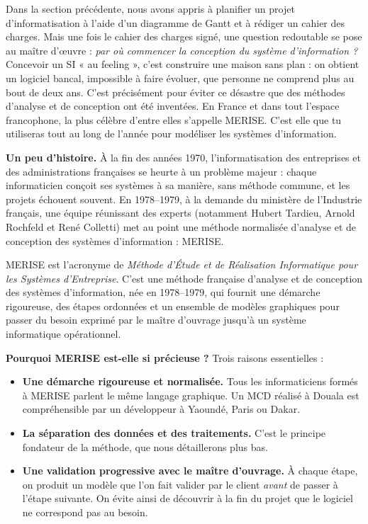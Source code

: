 \documentclass[11pt]{article}
\newcommand{\cle}[1]{{\popxbold\color{popdark}#1}}
\newcounter{popsec}
\newcounter{popsub}
\newcommand{\courssub}[1]{%
  \stepcounter{popsub}%
  \par\vspace{9pt}\noindent{\popxbold\fontsize{11.5}{13}\selectfont\color{popink}{\color{poporange}\thepopsec.\thepopsub}\hspace{6pt}#1}\par\nopagebreak\vspace{4pt}
}
\begin{document}
Dans la section précédente, nous avons appris à planifier un projet d'informatisation à l'aide d'un diagramme de Gantt et à rédiger un cahier des charges. Mais une fois le cahier des charges signé, une question redoutable se pose au maître d'œuvre : \emph{par où commencer la conception du système d'information ?} Concevoir un SI « au feeling », c'est construire une maison sans plan : on obtient un logiciel bancal, impossible à faire évoluer, que personne ne comprend plus au bout de deux ans. C'est précisément pour éviter ce désastre que des \cle{méthodes d'analyse et de conception} ont été inventées. En France et dans tout l'espace francophone, la plus célèbre d'entre elles s'appelle \cle{MERISE}. C'est elle que tu utiliseras tout au long de l'année pour modéliser les systèmes d'information.

\courssub{Présentation de MERISE}

\textbf{Un peu d'histoire.} À la fin des années 1970, l'informatisation des entreprises et des administrations françaises se heurte à un problème majeur : chaque informaticien conçoit ses systèmes à sa manière, sans méthode commune, et les projets échouent souvent. En 1978--1979, à la demande du \cle{ministère de l'Industrie} français, une équipe réunissant des experts (notamment Hubert Tardieu, Arnold Rochfeld et René Colletti) met au point une méthode normalisée d'analyse et de conception des systèmes d'information : MERISE.

\begin{definition}
\cle{MERISE} est l'acronyme de \emph{Méthode d'Étude et de Réalisation Informatique pour les Systèmes d'Entreprise}. C'est une méthode française d'\cle{analyse} et de \cle{conception} des systèmes d'information, née en 1978--1979, qui fournit une démarche rigoureuse, des étapes ordonnées et un ensemble de \cle{modèles} graphiques pour passer du besoin exprimé par le maître d'ouvrage jusqu'à un système informatique opérationnel.
\end{definition}

\textbf{Pourquoi MERISE est-elle si précieuse ?} Trois raisons essentielles :

\begin{itemize}
\item \textbf{Une démarche rigoureuse et normalisée.} Tous les informaticiens formés à MERISE parlent le même langage graphique. Un MCD réalisé à Douala est compréhensible par un développeur à Yaoundé, Paris ou Dakar.
\item \textbf{La séparation des données et des traitements.} C'est le principe fondateur de la méthode, que nous détaillerons plus bas.
\item \textbf{Une validation progressive avec le maître d'ouvrage.} À chaque étape, on produit un modèle que l'on fait valider par le client \emph{avant} de passer à l'étape suivante. On évite ainsi de découvrir à la fin du projet que le logiciel ne correspond pas au besoin.
\end{itemize}
\end{document}
